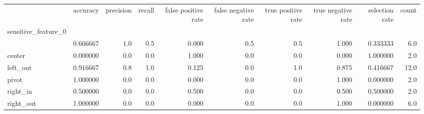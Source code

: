 \begin{tabular}{lrrrrrrrrr}
\toprule
{} &  accuracy &  precision &  recall &  false positive rate &  false negative rate &  true positive rate &  true negative rate &  selection rate &  count \\
sensitive\_feature\_0 &           &            &         &                      &                      &                     &                     &                 &        \\
\midrule
                    &  0.666667 &        1.0 &     0.5 &                0.000 &                  0.5 &                 0.5 &               1.000 &        0.333333 &    6.0 \\
center              &  0.000000 &        0.0 &     0.0 &                1.000 &                  0.0 &                 0.0 &               0.000 &        1.000000 &    2.0 \\
left\_out            &  0.916667 &        0.8 &     1.0 &                0.125 &                  0.0 &                 1.0 &               0.875 &        0.416667 &   12.0 \\
pivot               &  1.000000 &        0.0 &     0.0 &                0.000 &                  0.0 &                 0.0 &               1.000 &        0.000000 &    2.0 \\
right\_in            &  0.500000 &        0.0 &     0.0 &                0.500 &                  0.0 &                 0.0 &               0.500 &        0.500000 &    2.0 \\
right\_out           &  1.000000 &        0.0 &     0.0 &                0.000 &                  0.0 &                 0.0 &               1.000 &        0.000000 &    6.0 \\
\bottomrule
\end{tabular}
